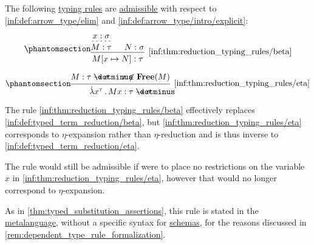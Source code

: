 \begin{proposition}\label{thm:reduction_typing_rules}
  The following \hyperref[con:typing_rule]{typing rules} are \hyperref[con:inference_rule_admissibility]{admissible} with respect to \ref{inf:def:arrow_type/elim} and \ref{inf:def:arrow_type/intro/explicit}:
  \begin{paracol}{2}
    \begin{leftcolumn}
      \ParacolAlignmentHack
      \begin{equation*}\taglabel[\ensuremath{ \rightarrow_\beta }]{inf:thm:reduction_typing_rules/beta}
        \begin{prooftree}
          \hypo{ x: \sigma }
          \infer[dashed]1{ M: \tau }

          \hypo{ N: \sigma }

          \infer2[\ref{inf:thm:reduction_typing_rules/beta}]{ M[x \mapsto N]: \tau }.
        \end{prooftree}
      \end{equation*}
    \end{leftcolumn}

    \begin{rightcolumn}
      \ParacolAlignmentHack
      \begin{equation*}\taglabel[\ensuremath{ \leftarrow_\eta }]{inf:thm:reduction_typing_rules/eta}
        \begin{prooftree}
          \hypo{ M: \tau \synimplies \sigma }
          \hypo{ x \not\in \op*{Free}(M) }
          \infer2[\ref{inf:thm:reduction_typing_rules/eta}]{ \qabs {x^{\tau}} M x: \tau \synimplies \sigma }.
        \end{prooftree}
      \end{equation*}
    \end{rightcolumn}
  \end{paracol}
\end{proposition}
\begin{comments}
  \item The rule \ref{inf:thm:reduction_typing_rules/beta} effectively replaces \ref{inf:def:typed_term_reduction/beta}, but \ref{inf:thm:reduction_typing_rules/eta} corresponds to \( \eta \)-expansion rather than \( \eta \)-reduction and is thus inverse to \ref{inf:def:typed_term_reduction/eta}.

  The rule would still be admissible if were to place no restrictions on the variable \( x \) in \ref{inf:thm:reduction_typing_rules/eta}, however that would no longer correspond to \( \eta \)-expansion.

  \item As in \cref{thm:typed_substitution_assertions}, this rule is stated in the \hyperref[con:metalogic]{metalanguage}, without a specific syntax for \hyperref[con:schemas_and_instances]{schemas}, for the reasons discussed in \cref{rem:dependent_type_rule_formalization}.

\end{comments}
